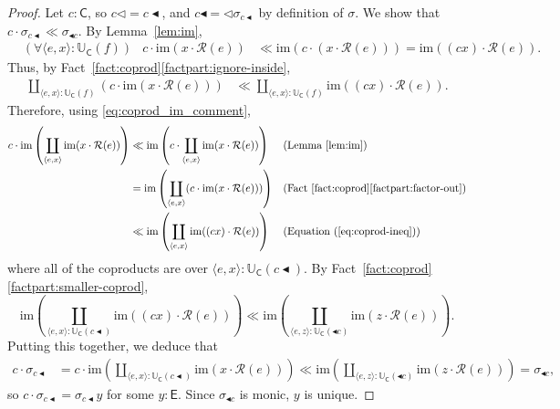 \documentclass{amsart}
\newcommand{\acat}[1]{\mathsf{#1}}
\numberwithin{lstfloat}{section}
\newcommand{\srcfunc}{\mathbin{\blacktriangleleft}}
\newcommand{\tgtfunc}{\mathbin{\blacktriangleleft}}
\newcommand{\src}[1]{#1\srcfunc}
\newcommand{\tgt}[1]{\tgtfunc #1}
\newcommand{\func}[1]{\mathcal{#1}}
\newcommand{\fR}{\func{R}}
\theoremstyle{definition}
\theoremstyle{remark}
\numberwithin{equation}{section}
\begin{document}
\begin{proof}
Let $c:\acat{C}$, so $c \lhd = \src{c}$, and $\src{c} = \lhd \sigma_{\src{c}}$
  by definition of $\sigma$. We show that $c\cdot \sigma_{\src{c}}
  \ll\sigma_{\tgt{c}}$. By Lemma~\ref{lem:im}, 
  \begin{align*} 
    &(\forall \langle e,x\rangle:\mathbb{U}_{\acat{C}}(f))&  c\cdot \mathrm{im}(x\cdot \fR(e))& \ll\mathrm{im}(c\cdot (x\cdot \fR(e))) = \mathrm{im}((cx)\cdot \fR(e)).
  \end{align*}
  Thus, by Fact~\ref{fact:coprod}\ref{factpart:ignore-inside},
  \begin{align}
    \label{eq:coprod-ineq}
    \coprod_{\langle e,x\rangle:\mathbb{U}_{\acat{C}}(f)} \left(c\cdot \mathrm{im}(x\cdot \fR(e))\right)
      &\ll \coprod_{\langle e,x\rangle:\mathbb{U}_{\acat{C}}(f)} \mathrm{im}((cx)\cdot \fR(e)).
  \end{align}
  Therefore, using \eqref{eq:coprod_im_comment},
\begin{align*}
  c\cdot \mathrm{im}\left(
    \coprod_{\langle e,x\rangle}
        \mathrm{im}(x\cdot \fR(e))
  \right) 
  & \ll  \mathrm{im}\left(
    c\cdot 
    \coprod_{\langle e,x\rangle}
        \mathrm{im}(x\cdot \fR(e))
  \right) & & (\text{Lemma~\ref{lem:im}}) \\
  & =  \mathrm{im}\left(
    \coprod_{\langle e,x\rangle}
      (c\cdot 
        \mathrm{im}(x\cdot \fR(e)))
  \right) & & (\text{Fact~\ref{fact:coprod}\ref{factpart:factor-out}}) \\
  & \ll  \mathrm{im}\left(
    \coprod_{\langle e,x\rangle}
        \mathrm{im}((cx)\cdot \fR(e))
  \right) & & (\text{Equation (\ref{eq:coprod-ineq})}) 
\end{align*} 
where all of the coproducts are over
$\langle e,x\rangle:\mathbb{U}_{\acat{C}}(\src{c})$. By 
Fact~\ref{fact:coprod}\ref{factpart:smaller-coprod}, 
\[ 
  \mathrm{im}\left(
    \coprod_{\langle e,x\rangle:\mathbb{U}_{\acat{C}}(\src{c})}
        \mathrm{im}((cx)\cdot \fR(e))
  \right) \ll \mathrm{im}\left(
        \coprod_{\langle e,z\rangle:\mathbb{U}_{\acat{C}}(\tgt{c})} 
          \mathrm{im}(z\cdot \fR(e))
    \right).
\]
Putting this together, we deduce that 
\begin{align*}
  c\cdot \sigma_{\src{c}} &= c\cdot \mathrm{im}\left(
    \coprod_{\langle e,x\rangle:\mathbb{U}_{\acat{C}}(\src{c})}
        \mathrm{im}(x\cdot \fR(e))
  \right) 
  \ll \mathrm{im}\left(
    \coprod_{\langle e,z\rangle:\mathbb{U}_{\acat{C}}(\tgt{c})} 
      \mathrm{im}(z\cdot \fR(e))
\right) = \sigma_{\tgt{c}}, 
\end{align*}
so $c\cdot \sigma_{\src{c}}=\sigma_{\src{c}}y$ for some $y:\acat{E}$. Since
$\sigma_{\tgt{c}}$ is monic, $y$ is unique. 
\end{proof}
\end{document}
